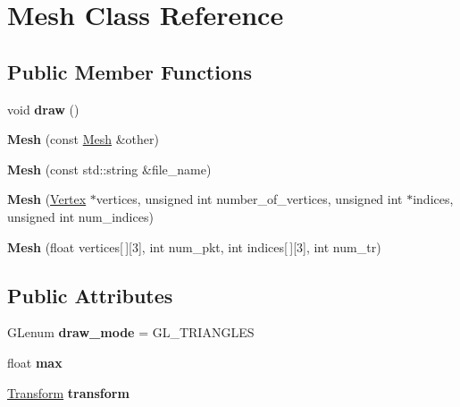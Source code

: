 \hypertarget{classMesh}{\section{Mesh Class Reference}
\label{classMesh}
}
\subsection*{Public Member Functions}
\begin{DoxyCompactItemize}
\item 
\hypertarget{classMesh_a996a8668fa2ca7d95d6d10744c833bc8}{void {\bfseries draw} ()}\label{classMesh_a996a8668fa2ca7d95d6d10744c833bc8}

\item 
\hypertarget{classMesh_af1bd04d292a520ce226a685b6ed49fbe}{{\bfseries Mesh} (const \hyperlink{classMesh}{Mesh} \&other)}\label{classMesh_af1bd04d292a520ce226a685b6ed49fbe}

\item 
\hypertarget{classMesh_a052f0fac7361903a016d3e5c263cb127}{{\bfseries Mesh} (const std\-::string \&file\-\_\-name)}\label{classMesh_a052f0fac7361903a016d3e5c263cb127}

\item 
\hypertarget{classMesh_a4e44b166b065b4a149e570bf4bde6979}{{\bfseries Mesh} (\hyperlink{classVertex}{Vertex} $\ast$vertices, unsigned int number\-\_\-of\-\_\-vertices, unsigned int $\ast$indices, unsigned int num\-\_\-indices)}\label{classMesh_a4e44b166b065b4a149e570bf4bde6979}

\item 
\hypertarget{classMesh_ab137b87c35c0085952cd500d373448c8}{{\bfseries Mesh} (float vertices\mbox{[}$\,$\mbox{]}\mbox{[}3\mbox{]}, int num\-\_\-pkt, int indices\mbox{[}$\,$\mbox{]}\mbox{[}3\mbox{]}, int num\-\_\-tr)}\label{classMesh_ab137b87c35c0085952cd500d373448c8}

\end{DoxyCompactItemize}
\subsection*{Public Attributes}
\begin{DoxyCompactItemize}
\item 
\hypertarget{classMesh_af172d8e2714afa0fee55e166dc273484}{G\-Lenum {\bfseries draw\-\_\-mode} = G\-L\-\_\-\-T\-R\-I\-A\-N\-G\-L\-E\-S}\label{classMesh_af172d8e2714afa0fee55e166dc273484}

\item 
\hypertarget{classMesh_a0f274b964358e07faa543421f0c79327}{float {\bfseries max}}\label{classMesh_a0f274b964358e07faa543421f0c79327}

\item 
\hypertarget{classMesh_adaae6716e6366111013999f0979038df}{\hyperlink{classTransform}{Transform} {\bfseries transform}}\label{classMesh_adaae6716e6366111013999f0979038df}

\end{DoxyCompactItemize}
